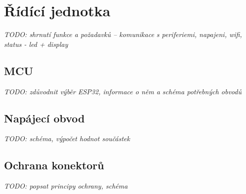 \section{Řídící jednotka}
\textit{TODO: shrnutí funkce a požadavků -- komunikace s periferiemi, napajeni, wifi, status - led + display} 
    \subsection{MCU}
        \textit{TODO: zdůvodnit výběr ESP32, informace o něm a schéma potřebných obvodů} 
    \subsection{Napájecí obvod}
        \textit{TODO: schéma, výpočet hodnot součástek} 
    \subsection{Ochrana konektorů}
        \textit{TODO: popsat principy ochrany, schéma} 